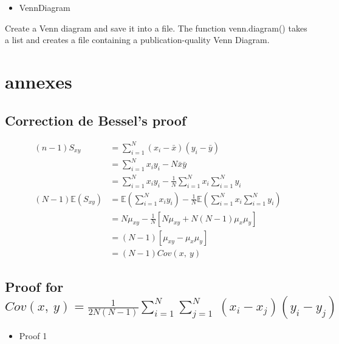 \documentclass[
]{report}
\providecommand{\tightlist}{%
  \setlength{\itemsep}{0pt}\setlength{\parskip}{0pt}}
\begin{document}
\begin{itemize}
\tightlist
\item
  VennDiagram
\end{itemize}

Create a Venn diagram and save it into a file. The function venn.diagram() takes a list and creates a file containing a publication-quality Venn Diagram.

\hypertarget{annexes}{%
\chapter{annexes}\label{annexes}}

\hypertarget{correction-de-bessels-proof}{%
\section{Correction de Bessel's proof}\label{correction-de-bessels-proof}}

\begin{align*}
(n-1)S_{xy} &= \sum_{i=1}^{N}(x_i-\bar x)(y_i - \bar y) \\
&= \sum_{i=1}^{N} x_i y_i -N\bar x \bar y\\
&= \sum_{i=1}^{N} x_i y_i - \frac{1}{N}\sum_{i=1}^{N} x_i \sum_{i=1}^{N} y_i\\
(N-1) \mathbb{E}(S_{xy}) &= \mathbb{E}\left(\sum_{i=1}^{N} x_i y_i\right) 
- \frac{1}{N}\mathbb{E}\left(\sum_{i=1}^{N} x_i \sum_{i=1}^{N} y_i\right)\\
&= N\mu_{xy} - \frac{1}{N}[N\mu_{xy} + N(N-1)\mu_x \mu_y]\\ 
&= (N-1)[\mu_{xy}-\mu_x\mu_y]\\
&= (N-1)Cov(x,~y)
\end{align*}

\hypertarget{proof-for-covxyfrac12nn-1sum_i1n-sum_j1nx_i-x_jy_i-y_j}{%
\section{\texorpdfstring{Proof for \(Cov(x,~y)=\frac{1}{2N(N-1)}\sum_{i=1}^{N} \sum_{j=1}^{N}~(x_i-x_j)(y_i-y_j)\)}{Proof for Cov(x,\textasciitilde y)=\textbackslash frac\{1\}\{2N(N-1)\}\textbackslash sum\_\{i=1\}\^{}\{N\} \textbackslash sum\_\{j=1\}\^{}\{N\}\textasciitilde(x\_i-x\_j)(y\_i-y\_j)}}\label{proof-for-covxyfrac12nn-1sum_i1n-sum_j1nx_i-x_jy_i-y_j}}

\begin{itemize}
\tightlist
\item
  Proof 1
\end{itemize}
\end{document}
